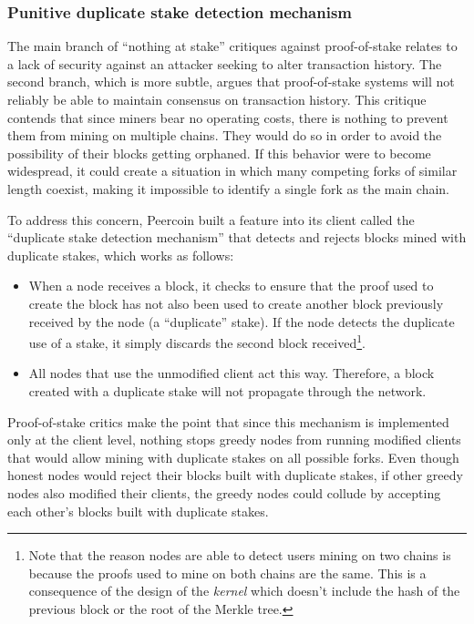 \documentclass[a4paper,11pt]{article}
\begin{document}
\subsubsection*{Punitive duplicate stake detection mechanism}

The main branch of ``nothing at stake'' critiques against proof-of-stake relates to a lack of security against an attacker seeking to alter transaction history. The second branch, which is more subtle, argues that proof-of-stake systems will not reliably be able to maintain consensus on transaction history. This critique contends that since miners bear no operating costs, there is nothing to prevent them from mining on multiple chains. They would do so in order to avoid the possibility of their blocks getting orphaned. If this behavior were to become widespread, it could create a situation in which many competing forks of similar length coexist, making it impossible to identify a single fork as the main chain. 




To address this concern, Peercoin built a feature into its client called the ``duplicate stake detection mechanism'' that detects and rejects blocks mined with duplicate stakes, which works as follows:
\begin{itemize}
\item{When a node receives a block, it checks to ensure that the proof used to create the block has not also been used to create another block previously received by the node (a ``duplicate'' stake). If the node detects the duplicate use of a stake, it simply discards the second block received\footnote{ Note that the reason nodes are able to detect users mining on two chains is because the proofs used to mine on both chains are the same. This is a consequence of the design of the \textit{kernel} which doesn't include the hash of the previous block or the root of the Merkle tree. }.}
\item{All nodes that use the unmodified client act this way. Therefore, a block created with a duplicate stake will not propagate through the network.}
\end{itemize}

Proof-of-stake critics make the point that since this mechanism is implemented only at the client level, nothing stops greedy nodes from running modified clients that would allow mining with duplicate stakes on all possible forks. Even though honest nodes would reject their blocks built with duplicate stakes, if other greedy nodes also modified their clients, the greedy nodes could collude by accepting each other's blocks built with duplicate stakes. 
\end{document}
